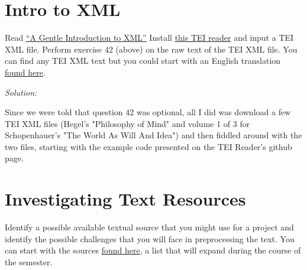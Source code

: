 \documentclass[11pt]{article}
\newenvironment{solution}{
	\vspace{10px}\noindent\emph{Solution:}
}{
	\vspace{10px}
}
\begin{document}
\newpage
\section*{Intro to XML} Read \href{http://www.tei-c.org/release/doc/tei-p5-doc/en/html/SG.html}{“A Gentle Introduction to XML”} 
Install \href{https://github.com/UUDigitalHumanitieslab/tei_reader}{this TEI reader} and input a TEI XML file.
Perform exercise 42 (above) on the raw text of the TEI XML file. You can find any TEI XML text but you could start with an English translation \href{https://github.com/OpenGreekAndLatin/english_trans-dev/tree/master/volumes}{found here}. 


\begin{solution}
	
	Since we were told that question 42 was optional, all I did was download a few TEI XML files (Hegel's "Philosophy of Mind" and volume 1 of 3 for Schopenhauer's "The World As Will And Idea") and then fiddled around with the two files, starting with the example code presented on the TEI Reader's github page. 
	
	
\end{solution} 



\newpage
\section*{Investigating Text Resources} Identify a possible available textual source that you might use for a project and identify the possible challenges that you will face in preprocessing the text. You can start with the sources \href{https://docs.google.com/document/d/1Hh93ixO_204mtS0Vva-X52bt1ZJMajLHxrcmfWF5JHg/edit}{found here}, a list that will expand during the course of the semester.
\end{document}
